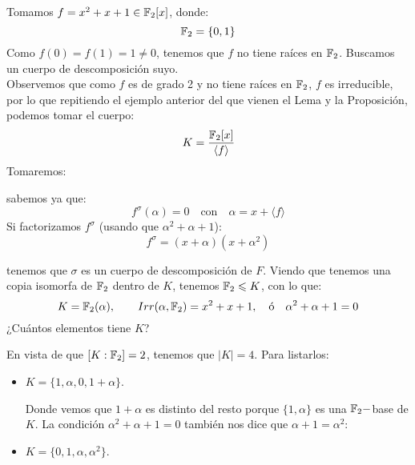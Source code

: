 \begin{ejemplo}
    Tomamos $f = x^2+x+1\in \mathbb{F}_2[x]$, donde:
    \begin{equation*}
        \mathbb{F}_2 = \{0,1\}
    \end{equation*}
    Como $f(0) = f(1) = 1 \neq 0$, tenemos que $f$ no tiene raíces en $\mathbb{F}_2$. Buscamos un cuerpo de descomposición suyo.\\

    \noindent
    Observemos que como $f$ es de grado 2 y no tiene raíces en $\mathbb{F}_2$, $f$ es irreducible, por lo que repitiendo el ejemplo anterior del que vienen el Lema y la Proposición, podemos tomar el cuerpo:
    \begin{equation*}
        K = \dfrac{\mathbb{F}_2[x]}{\langle f \rangle }
    \end{equation*}
    Tomaremos: 

    sabemos ya que:
    \begin{equation*}
        f^\sigma(\alpha) = 0 \quad \text{con}\quad  \alpha = x+\langle f \rangle 
    \end{equation*}
    Si factorizamos $f^\sigma$ (usando que $\alpha^2 + \alpha+1$):
    \begin{equation*}
        f^\sigma = (x+\alpha)(x+\alpha^2)
    \end{equation*}

    tenemos que $\sigma$ es un cuerpo de descomposición de $F$. Viendo que tenemos una copia isomorfa de $\mathbb{F}_2$ dentro de $K$, tenemos $\mathbb{F}_2\leqslant K$, con lo que:
    \begin{equation*}
        K = \mathbb{F}_2(\alpha), \qquad Irr(\alpha,\mathbb{F}_2) = x^2+x+1, \quad \text{ó}\quad \alpha^2 + \alpha+1=0
    \end{equation*}
    ¿Cuántos elementos tiene $K$?

    \noindent
    En vista de que $[K:\mathbb{F}_2] = 2$, tenemos que $|K| = 4$. Para listarlos:
    \begin{itemize}
        \item $K = \{1,\alpha,0,1+\alpha\}$. 

            Donde vemos que $1+\alpha$ es distinto del resto porque $\{1,\alpha\}$ es una $\mathbb{F}_2-$base de $K$. La condición $\alpha^2 + \alpha + 1 = 0$ también nos dice que $\alpha+1= \alpha^2$:
        \item $K = \{0,1,\alpha,\alpha^2\}$.
    \end{itemize}
\end{ejemplo}


